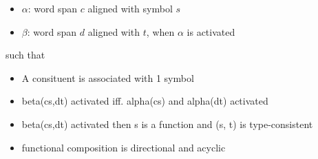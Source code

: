 \documentclass{beamer}
\begin{document}
\begin{frame}
     {
        \begin{itemize}
            \item $\alpha$: word span $c$ aligned with symbol $s$
            \item $\beta$: word span $d$ aligned with $t$, when $\alpha$ is activated
        \end{itemize}

        such that

        \begin{itemize}
            \item A consituent is associated with 1 symbol
            \item beta(cs,dt) activated iff. alpha(cs) and alpha(dt) activated
            \item beta(cs,dt) activated then s is a function and (s, t) is type-consistent
            \item functional composition is directional and acyclic
        \end{itemize}
    }

\end{frame}
\end{document}
